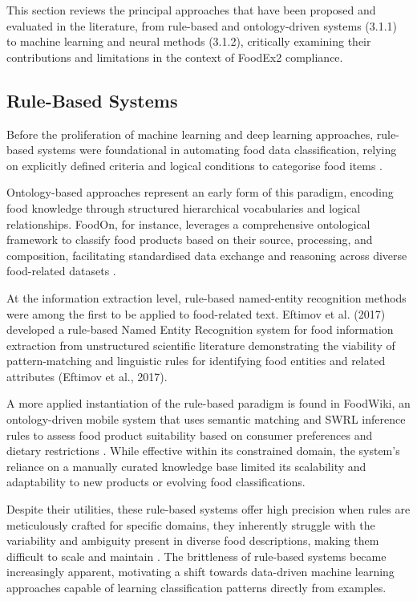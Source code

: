 This section reviews the principal approaches that have been proposed and evaluated in the literature, from rule-based and ontology-driven systems (3.1.1) to machine learning and neural methods (3.1.2), critically examining their contributions and limitations in the context of FoodEx2 compliance.

\hypertarget{rule-based-systems}{%
\subsection{Rule-Based Systems}\label{rule-based-systems}}

Before the proliferation of machine learning and deep learning approaches, rule-based systems were foundational in automating food data classification, relying on explicitly defined criteria and logical conditions to categorise food items \parencite{azanzi_jiomekong_ec1ddc5a}.

Ontology-based approaches represent an early form of this paradigm, encoding food knowledge through structured hierarchical vocabularies and logical relationships. FoodOn, for instance, leverages a comprehensive ontological framework to classify food products based on their source, processing, and composition, facilitating standardised data exchange and reasoning across diverse food-related datasets \parencite{gjorgjina_cenikj_0ae807f2,damion_dooley_8eedd589}.

At the information extraction level, rule-based named-entity recognition methods were among the first to be applied to food-related text. Eftimov et al. (2017) developed a rule-based Named Entity Recognition system for food information extraction from unstructured scientific literature demonstrating the viability of pattern-matching and linguistic rules for identifying food entities and related attributes (Eftimov et al., 2017).

A more applied instantiation of the rule-based paradigm is found in FoodWiki, an ontology-driven mobile system that uses semantic matching and SWRL inference rules to assess food product suitability based on consumer preferences and dietary restrictions \parencite{duygu__elik_ertu_rul_145c1b77}. While effective within its constrained domain, the system's reliance on a manually curated knowledge base limited its scalability and adaptability to new products or evolving food classifications.

Despite their utilities, these rule-based systems offer high precision when rules are meticulously crafted for specific domains, they inherently struggle with the variability and ambiguity present in diverse food descriptions, making them difficult to scale and maintain \parencite{simon_mezgec_ec31e9e4}. The brittleness of rule-based systems became increasingly apparent, motivating a shift towards data-driven machine learning approaches capable of learning classification patterns directly from examples.

